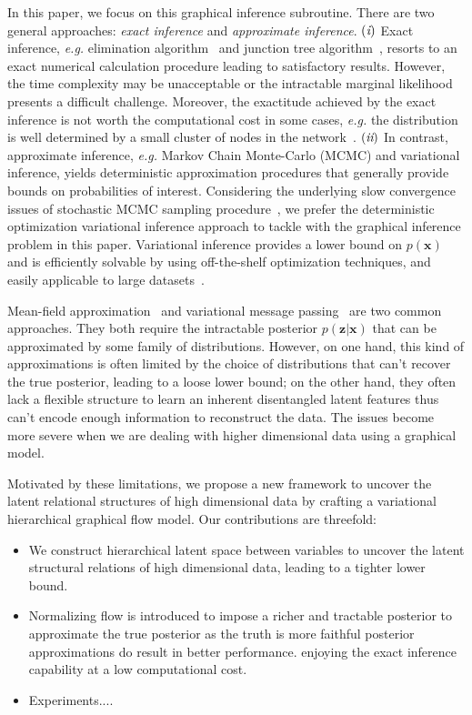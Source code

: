 \documentclass[conference]{IEEEtran}
\newcommand{\RN}[1]{%
	\textup{\lowercase\expandafter{\it \romannumeral#1}}%
}
\begin{document}
In this paper, we focus on this graphical inference subroutine. There are two general approaches: \textit{exact inference} and \textit{approximate inference}. $(\RN{1})$ Exact inference, \textit{e.g.} elimination algorithm~\cite{sanner2012symbolic} and junction tree algorithm~\cite{kahle2008junction}, resorts to an exact numerical calculation procedure leading to satisfactory results. However, the time complexity may be unacceptable or the intractable marginal likelihood presents a difficult challenge. Moreover, the exactitude achieved by the exact inference is not worth the computational cost in some cases, \textit{e.g.} the distribution is well determined by a small cluster of nodes in the network~\cite{jordan1999introduction}. $(\RN{2})$ In contrast, approximate inference, \textit{e.g.} Markov Chain Monte-Carlo (MCMC) and variational inference, yields deterministic approximation procedures that generally provide bounds on probabilities of interest. Considering the underlying slow convergence issues of stochastic MCMC sampling procedure~\cite{salimans2015markov}, we prefer the deterministic optimization variational inference approach to tackle with the graphical inference problem in this paper. Variational inference provides a lower bound on $p(\mathbf{x})$ and is efficiently solvable by using off-the-shelf optimization techniques, and easily applicable to large datasets~\cite{liu2016stein,kingma2013auto}.

Mean-field approximation~\cite{xing2012generalized} and variational message passing~\cite{winn2005variational} are two common approaches. They both require the intractable posterior $p(\mathbf{z}|\mathbf{x})$ that can be approximated by some family of distributions. However, on one hand, this kind of approximations is often limited by the choice of distributions that can't recover the true posterior, leading to a loose lower bound; on the other hand, they often lack a flexible structure to learn an inherent disentangled latent features thus can't encode enough information to reconstruct the data. The issues become more severe when we are dealing with higher dimensional data using a graphical model. 

Motivated by these limitations, we propose a new framework to uncover the latent relational structures of high dimensional data by crafting a variational hierarchical graphical flow model. Our contributions are threefold:
\begin{itemize}
    \item We construct hierarchical latent space between variables to uncover the latent structural relations of high dimensional data, leading to a tighter lower bound.
    \item Normalizing flow is introduced to impose a richer and tractable posterior to approximate the true posterior as the truth is more faithful posterior approximations do result in better performance.  enjoying the exact inference capability at a low computational cost.
    \item Experiments....
\end{itemize}
\end{document}
